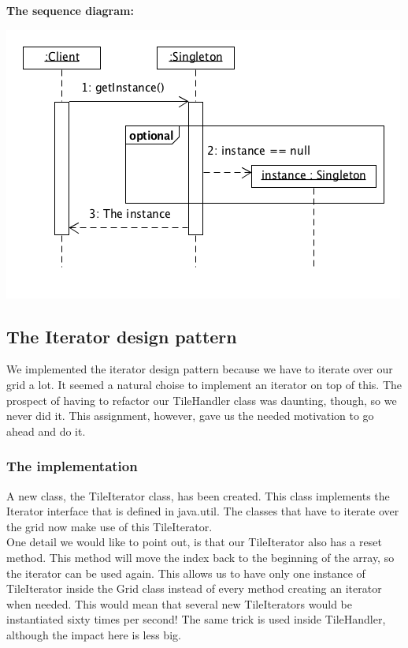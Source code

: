 \documentclass[a4paper,11pt,report]{scrartcl}
\begin{document}
\newpage\textbf{The sequence diagram:}\\
\centerline{\includegraphics[scale=1.0]{sources/SingletonSequence}}

\newpage\subsection{The Iterator design pattern}
We implemented the iterator design pattern because we have to iterate over our
grid a lot. It seemed a natural choise to implement an iterator on top of this.
The prospect of having to refactor our TileHandler class was daunting, though,
so we never did it. This assignment, however, gave us the needed motivation to
go ahead and do it.

\subsubsection{The implementation}
A new class, the TileIterator class, has been created. This class implements the
Iterator interface that is defined in java.util. The classes that have to
iterate over the grid now make use of this TileIterator.\\

One detail we would like to point out, is that our TileIterator also has a reset
method. This method will move the index back to the beginning of the array, so
the iterator can be used again. This allows us to have only one instance of
TileIterator inside the Grid class instead of every method creating an iterator
when needed. This would mean that several new TileIterators would be
instantiated sixty times per second! The same trick is used inside TileHandler,
although the impact here is less big.
\end{document}
